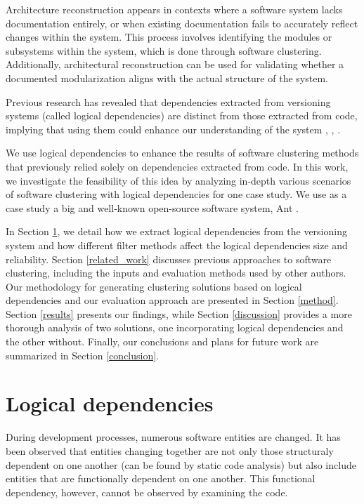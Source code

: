 \documentclass[conference, a4paper]{IEEEtran}
\begin{document}
Architecture reconstruction appears in contexts where a software system lacks documentation entirely, or when existing documentation fails to accurately reflect changes within the system. This process involves identifying the modules or subsystems within the system, which is done through software clustering. Additionally, architectural reconstruction can be used for validating whether a documented modularization aligns with the actual structure of the system.

Previous research has revealed that dependencies extracted from versioning systems (called logical dependencies) are distinct from those extracted from code, implying that using them could enhance our understanding of the system \cite{DBLP:conf/issre/OlivaG15}, \cite{DBLP:journals/jss/AjienkaC17}, \cite{Oliva:2011:ISL:2067853.2068086}.

We use logical dependencies to enhance the results of software clustering methods that previously relied solely on dependencies extracted from code. In this work, we investigate the feasibility of this idea by analyzing in-depth various scenarios of software clustering with logical dependencies for one case study. We use as a case study a big and well-known open-source software system, Ant \cite{ApacheAntGitHub}.

In Section \ref{ld_def}, we detail how we extract logical dependencies from the versioning system and how different filter methods affect the logical dependencies size and reliability. Section \ref{related_work} discusses previous approaches to software clustering, including the inputs and evaluation methods used by other authors. Our methodology for generating clustering solutions based on logical dependencies and our evaluation approach are presented in Section \ref{method}. Section \ref{results} presents our findings, while Section \ref{discussion} provides a more thorough analysis of two solutions, one incorporating logical dependencies and the other without. Finally, our conclusions and plans for future work are summarized in Section \ref{conclusion}.


\section{Logical dependencies}
\label{ld_def}

During development processes, numerous software entities are changed. It has been observed that entities changing together are not only those structuraly dependent on one another (can be found by static code analysis) but also include entities that are functionally dependent on one another. This functional dependency, however, cannot be observed by examining the code.
\end{document}
